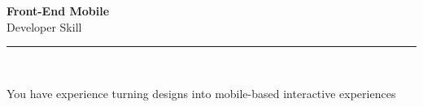 \documentclass[11pt,a4paper]{memoir}
\begin{document}
    \begin{Spacing}{0.75}%
        \noindent
        \Large
        \textbf{Front-End Mobile}\\[3pt]
        \scriptsize\color{gray}Developer Skill\\ 
        \rule{\textwidth}{.3mm}\\
        
        \vspace{3mm}
        \noindent
        \begin{minipage}[t]{53mm}
            \begin{flushleft}
            {
                \normalsize
                \begin{Spacing}{1}%
                \color{black}\textrm{You have experience turning designs into mobile-based interactive experiences}\\
                \end{Spacing}
            }
            \end{flushleft}
        \end{minipage}

        \vspace{5mm}
        \noindent
        \begin{minipage}[t]{53mm}
            \begin{flushleft}
            {
                \normalsize
                \begin{Spacing}{1}%
                \color{gray}\textit{}\\
                \end{Spacing}
            }
            \end{flushleft}
        \end{minipage}
    \end{Spacing}
    \clearpage
\end{document}
